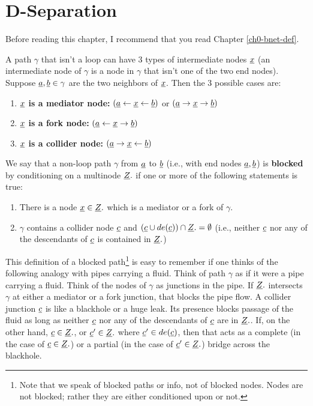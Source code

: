\chapter{D-Separation}
\label{ch-dsep}
Before reading this chapter,
I  recommend
that you
read
Chapter \ref{ch0-bnet-def}.


A path $\gamma$ that
isn't a loop can have 
3 types of intermediate
 nodes ${\underline{x}}$ (an intermediate
 node of $\gamma$
 is a node in $\gamma$ that 
isn't one
of the two end nodes).
Suppose ${\underline{a}},{\underline{b}}\in \gamma$
are the two neighbors of ${\underline{x}}$. Then
the 3 possible cases are:
\begin{enumerate}
\item {\bf${\underline{x}}$ is a mediator node:}
$({\underline{a}}\leftarrow{\underline{x}}\leftarrow {\underline{b}})$
or
$({\underline{a}}\rightarrow{\underline{x}}\rightarrow {\underline{b}})$
\item {\bf ${\underline{x}}$ is a fork node:}
$({\underline{a}}\leftarrow{\underline{x}}\rightarrow {\underline{b}})$
\item {\bf ${\underline{x}}$ is a collider node:}
$({\underline{a}}\rightarrow{\underline{x}}\leftarrow {\underline{b}})$
\end{enumerate}

We say that a non-loop path 
$\gamma$ 
from ${\underline{a}}$ to ${\underline{b}}$ (i.e., with
end nodes ${\underline{a}}, {\underline{b}}$)
is {\bf blocked}
by conditioning on a multinode ${\underline{Z}}.$
if one or more 
of the following
statements is true:

\begin{enumerate}
\item 
There is a node ${\underline{x}}\in {\underline{Z}}.$
which is a mediator 
or a fork of $\gamma$.
\item
$\gamma$ contains a collider
node ${\underline{c}}$
and 
$({\underline{c}}\cup de({\underline{c}}))\cap{\underline{Z}}.=\emptyset$
(i.e., neither 
${\underline{c}}$ nor 
any of the descendants of ${\underline{c}}$
is contained in ${\underline{Z}}.$)
\end{enumerate}

This definition of a blocked 
path\footnote{Note
that we speak of 
blocked paths or info,
not of blocked nodes.
Nodes are not blocked;
rather they are either 
conditioned upon
or not.}
 is easy to remember
if one thinks 
of the following analogy
with pipes carrying a fluid.
Think of path
$\gamma$ as if it
were a pipe
carrying a fluid.
Think of
the nodes 
of $\gamma$ as junctions in the pipe.
If ${\underline{Z}}.$
intersects $\gamma$
at either a mediator
or a fork junction,
that blocks the pipe flow.
A collider junction ${\underline{c}}$
is like a blackhole 
or a huge leak.
Its presence
blocks passage
of the fluid
as long
as neither
${\underline{c}}$
nor any of
the descendants 
of ${\underline{c}}$
are in ${\underline{Z}}.$.
If,
on the 
other hand,
${\underline{c}}\in{\underline{Z}}.$,
or ${\underline{c}}'\in {\underline{Z}}.$
where ${\underline{c}}'\in de({\underline{c}})$,
then
that acts
as a complete
(in the case of ${\underline{c}}\in{\underline{Z}}.$)
or a partial 
(in the case of ${\underline{c}}'\in{\underline{Z}}.$)
bridge across the blackhole.

